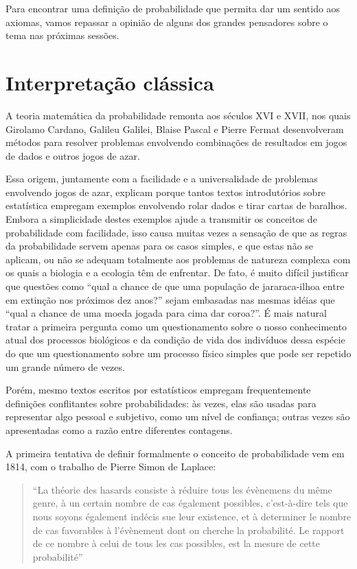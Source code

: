 Para encontrar uma definição de probabilidade que permita dar um sentido aos axiomas, vamos repassar a opinião de alguns dos 
grandes pensadores sobre o tema nas próximas sessões.

\section{Interpretação clássica}
A teoria matemática da probabilidade remonta aos séculos XVI e XVII, nos quais Girolamo Cardano, Galileu Galilei, Blaise Pascal
e Pierre Fermat desenvolveram métodos para resolver problemas envolvendo combinações de resultados em jogos de dados e outros
jogos de azar. 

Essa origem, juntamente com a facilidade e a universalidade de problemas envolvendo jogos de azar, explicam porque tantos textos
introdutórios sobre estatística empregam exemplos envolvendo rolar dados e tirar cartas de baralhos. Embora a simplicidade
destes exemplos ajude a transmitir os conceitos de probabilidade com facilidade, isso causa muitas vezes a sensação de que
as regras da probabilidade servem apenas para os casos simples, e que estas não se aplicam, ou não se adequam totalmente aos 
problemas de natureza complexa com os quais a biologia e a ecologia têm de enfrentar. De fato, é muito difícil justificar que
questões como ``qual a chance de que uma população de jararaca-ilhoa entre em extinção nos próximos dez anos?'' sejam embasadas
nas mesmas idéias que ``qual a chance de uma moeda jogada para cima dar coroa?''. É mais natural tratar a primeira pergunta como
um questionamento sobre o nosso conhecimento atual dos processos biológicos e da condição de vida dos indivíduos dessa espécie
do que um questionamento sobre um processo físico simples que pode ser repetido um grande número de vezes. 

Porém, mesmo textos escritos por estatísticos empregam frequentemente definições conflitantes sobre probabilidades: às vezes,
elas são usadas para representar algo pessoal e subjetivo, como um nível de confiança; outras vezes são apresentadas como a
razão entre diferentes contagens.

A primeira tentativa de definir formalmente o conceito de probabilidade vem em 1814,
com o trabalho de Pierre Simon de Laplace:

\begin{quote}
``La théorie des hasards consiste à réduire tous les évènemens du même genre, à un certain nombre de cas également
possibles, c'est-à-dire tels que nous soyons également indécis sue leur existence, et à determiner le nombre de cas
favorables à l'évènement dont on cherche la probabilité. Le rapport de ce nombre à celui de tous les cas possibles,
est la mesure de cette probabilité'' 
\citep{Laplace1814}
\end{quote}

